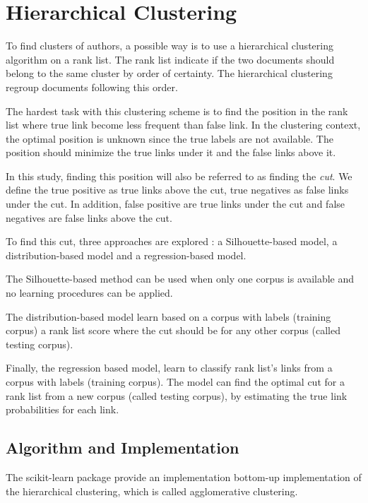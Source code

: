\section{Hierarchical Clustering \label{sec:authorship_clustering_methods}}

To find clusters of authors, a possible way is to use a hierarchical clustering algorithm on a rank list.
The rank list indicate if the two documents should belong to the same cluster by order of certainty.
The hierarchical clustering regroup documents following this order.

The hardest task with this clustering scheme is to find the position in the rank list where true link become less frequent than false link.
In the clustering context, the optimal position is unknown since the true labels are not available.
The position should minimize the true links under it and the false links above it.

In this study, finding this position will also be referred to as finding the \textit{cut}.
We define the true positive as true links above the cut, true negatives as false links under the cut.
In addition, false positive are true links under the cut and false negatives are false links above the cut.

To find this cut, three approaches are explored : a Silhouette-based model, a distribution-based model and a regression-based model.

The Silhouette-based method can be used when only one corpus is available and no learning procedures can be applied.

The distribution-based model learn based on a corpus with labels (training corpus) a rank list score where the cut should be for any other corpus (called testing corpus).

Finally, the regression based model, learn to classify rank list's links from a corpus with labels (training corpus).
The model can find the optimal cut for a rank list from a new corpus (called testing corpus), by estimating the true link probabilities for each link.

\subsection{Algorithm and Implementation \label{sec:algorithm_and_implementation}}

The scikit-learn package \cite{sklearn} provide an implementation bottom-up implementation of the hierarchical clustering, which is called agglomerative clustering.


